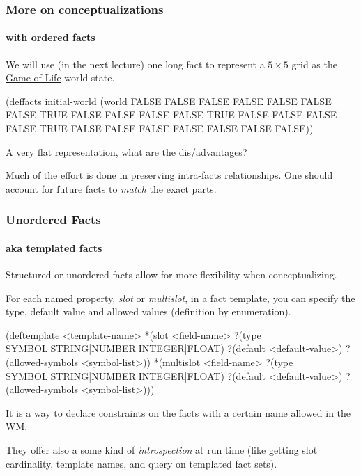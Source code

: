 \documentclass[xcolor={usenames,dvipsnames,svgnames}, compress]{beamer}
\begin{document}
\begin{frame}[fragile]
  \frametitle{More on conceptualizations}
  \framesubtitle{with ordered facts}
  We will use (in the next lecture) one long fact to represent a $5\times5$ grid as the
  \href{http://en.wikipedia.org/wiki/Conway\%27s_Game_of_Life}{\textsf{Game of Life}} world state.
  \begin{clips-code}[numbers=none]
    (deffacts initial-world
        (world FALSE FALSE FALSE FALSE FALSE
               FALSE FALSE TRUE FALSE FALSE
               FALSE FALSE TRUE FALSE FALSE
               FALSE FALSE TRUE FALSE FALSE
               FALSE FALSE FALSE FALSE FALSE))
  \end{clips-code}
  A very flat representation, what are the dis/advantages?\par\bigskip
  
  Much of the effort is done in preserving intra-facts
  relationships. One should account for future facts to \emph{match}
  the exact parts.
\end{frame}


\begin{frame}[fragile]
  \frametitle{Unordered Facts}
  \framesubtitle{aka templated facts}
  Structured or unordered facts allow for more flexibility when
  conceptualizing.\par
  For each named property, \emph{slot} or \emph{multislot}, in a fact template, you can specify the
   type, default value and allowed values (definition by enumeration).
  \begin{clips-code}[numbers=none]
    (deftemplate <template-name>
        *(slot <field-name>
            ?(type SYMBOL|STRING|NUMBER|INTEGER|FLOAT)
            ?(default <default-value>)
            ?(allowed-symbols <symbol-list>))
        *(multislot <field-name>
            ?(type SYMBOL|STRING|NUMBER|INTEGER|FLOAT)
            ?(default <default-value>)
            ?(allowed-symbols <symbol-list>)))
          \end{clips-code}
          
   It is a way to declare constraints on the facts with a certain
   name allowed in the WM.\par\bigskip
   
   They offer also a some kind of \emph{introspection} at run time (like
   getting slot cardinality, template names, and query on templated fact sets).
\end{frame}
\end{document}

